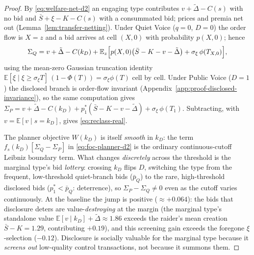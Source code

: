 \documentclass[11pt]{article}
\newcommand{\E}{\mathbb{E}}
\newcommand{\1}{\mathbf{1}}
\begin{document}
\begin{proof}
By \eqref{eq:welfare-net-d2} an engaging type contributes $v+\tilde\Delta-C(s)$
with no bid and $\bar S+\xi-K-C(s)$ with a consummated bid; prices and premia net
out (Lemma~\ref{lem:transfer-netting}). Under Quiet Voice ($q=0$, $D=0$) the
order flow is $X=z$ and a bid arrives at cell $(X,0)$ with probability $p(X,0)$;
hence
\[
\Sigma_Q=v+\tilde\Delta-C(k_D)
 +\E_z\Bigl[p(X,0)\bigl(\bar S-K-v-\tilde\Delta\bigr)
 +\sigma_\xi\,\phi(T_{X,0})\Bigr],
\]
using the mean-zero Gaussian truncation identity
$\E[\xi\mid\xi\ge\sigma_\xi T]\,(1-\Phi(T))=\sigma_\xi\phi(T)$ cell by cell.
Under Public Voice ($D=1$) the disclosed branch is order-flow invariant
(Appendix~\ref{app:proof-disclosed-invariance}), so the same computation gives
$\Sigma_P=v+\tilde\Delta-C(k_D)
 +p_1^{\ast}(\bar S-K-v-\tilde\Delta)+\sigma_\xi\,\phi(T_1)$. Subtracting, with
$v=\E[v\mid s{=}k_D]$, gives \eqref{eq:reclass-real}.

The planner objective $W(k_D)$ is itself \emph{smooth} in $k_D$: the term
$f_s(k_D)[\Sigma_Q-\Sigma_P]$ in \eqref{eq:foc-planner-d2} is the ordinary
continuous-cutoff Leibniz boundary term. What changes \emph{discretely} across the
threshold is the marginal type's bid \emph{lottery}: crossing $k_D$ flips $D$,
switching the type from the frequent, low-threshold quiet-branch bids
($\bar p_Q$) to the rare, high-threshold disclosed bids ($p_1^{\ast}<\bar p_Q$:
deterrence), so $\Sigma_P-\Sigma_Q\neq0$ even as the cutoff varies continuously.
At the baseline the jump is positive ($\approx+0.064$): the bids that disclosure
deters are value-\emph{destroying} at the margin (the marginal type's standalone
value $\E[v\mid k_D]+\tilde\Delta\approx1.86$ exceeds the raider's mean creation
$\bar S-K=1.29$, contributing $+0.19$), and this screening gain exceeds the
foregone $\xi$-selection ($-0.12$). Disclosure is socially valuable for the
marginal type because it \emph{screens out} low-quality control transactions, not
because it summons them.
\end{proof}
\end{document}
